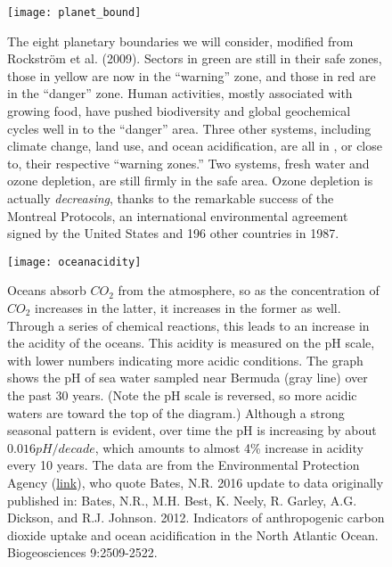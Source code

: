 \newpage
\begin{figure}[p]
\centering
  \texttt{[image: planet\_bound]}%

\caption{The eight planetary boundaries we will consider, modified from Rockstr\"{o}m et al. (2009). Sectors in green are still in their safe zones, those in yellow are now in the ``warning'' zone, and those in red  are in the ``danger'' zone. Human activities, mostly associated with growing food, have pushed biodiversity and global geochemical cycles well in to the ``danger'' area. Three other systems, including climate change, land use, and ocean acidification, are all in , or close to, their respective ``warning zones.'' Two systems, fresh water and ozone depletion, are still firmly in the safe area. Ozone depletion is actually \emph{decreasing}, thanks to the remarkable success of the Montreal Protocols, an international environmental agreement signed by the United States and 196 other countries in 1987.}
\label{fig:planet_bound}
\end{figure}

\newpage
\begin{figure}[p]
\centering
  \texttt{[image: oceanacidity]}%


\caption{Oceans absorb $CO_2$ from the atmosphere, so as the concentration of $CO_2$ increases in the latter, it increases in the former as well. Through a series of chemical reactions, this leads to an increase in the acidity of the oceans. This acidity is measured on the pH scale, with lower numbers indicating more acidic conditions. The graph shows the pH of sea water sampled near Bermuda (gray line) over the past 30 years. (Note the pH scale is reversed, so more acidic waters are toward the top of the diagram.)  Although a strong seasonal pattern is evident, over time the pH is increasing by about $0.016 pH/decade$, which amounts to almost 4\% increase in acidity every 10 years. The data are from the Environmental Protection Agency (\href{https://www.epa.gov/climate-indicators/climate-change-indicators-ocean-acidity\#ref5}{link}), who quote Bates,  N.R. 2016 update to data originally published in: Bates, N.R., M.H. Best, K. Neely, R. Garley, A.G. Dickson, and R.J. Johnson. 2012. Indicators of anthropogenic carbon dioxide uptake and ocean acidification in the North Atlantic Ocean. Biogeosciences 9:2509-2522.}
\label{fig:ocean_acidity}
\end{figure}

